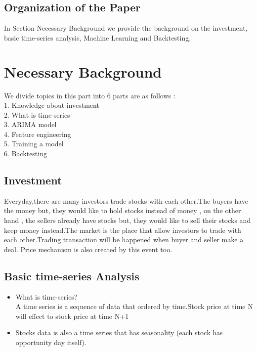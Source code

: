 \documentclass{article}
\begin{document}
\subsection{Organization of the Paper}

In Section Necessary Background we provide the background on the investment, basic time-series analysis, Machine Learning and Backtesting.



\section{Necessary Background}
\label{sec:background}


We divide topics in this part into 6 parts are as follows :\\
1. Knowledge about investment\\
2. What is time-series\\
3. ARIMA model\\
4. Feature engineering\\
5. Training a model\\
6. Backtesting\\


\subsection{Investment}
Everyday,there are many investors trade stocks with each other.The buyers have the money but, they would like to hold stocks instead of money , on the other hand , the sellers already have stocks but, they would like to sell their stocks and keep money instead.The market is the place that allow investors to trade with each other.Trading transaction will be happened when buyer and seller make a deal.
Price mechanism is also created by this event too.

\subsection{Basic time-series Analysis}
\begin{itemize}
\item What is time-series?\\A time series is a sequence of data that ordered by time.Stock price at time N will 
effect to stock price at time N+1
\item Stocks data is also a time series that has seasonality (each stock has opportunity day itself).
\end{itemize}
\end{document}
